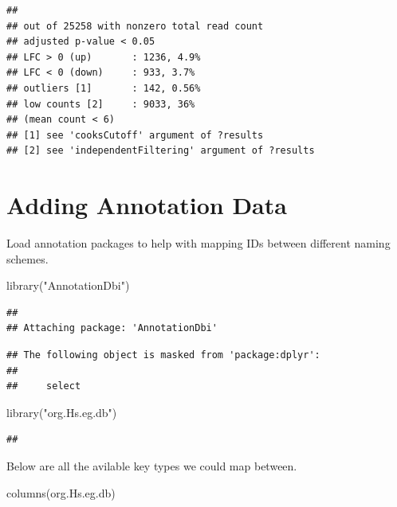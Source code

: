 \documentclass[
]{article}
\newenvironment{Shaded}{\begin{snugshade}}{\end{snugshade}}
\newcommand{\FunctionTok}[1]{\textcolor[rgb]{0.00,0.00,0.00}{#1}}
\newcommand{\NormalTok}[1]{#1}
\newcommand{\StringTok}[1]{\textcolor[rgb]{0.31,0.60,0.02}{#1}}
\begin{document}
\begin{verbatim}
## 
## out of 25258 with nonzero total read count
## adjusted p-value < 0.05
## LFC > 0 (up)       : 1236, 4.9%
## LFC < 0 (down)     : 933, 3.7%
## outliers [1]       : 142, 0.56%
## low counts [2]     : 9033, 36%
## (mean count < 6)
## [1] see 'cooksCutoff' argument of ?results
## [2] see 'independentFiltering' argument of ?results
\end{verbatim}

\hypertarget{adding-annotation-data}{%
\section{Adding Annotation Data}\label{adding-annotation-data}}

Load annotation packages to help with mapping IDs between different
naming schemes.

\begin{Shaded}
\begin{Highlighting}[]
\FunctionTok{library}\NormalTok{(}\StringTok{"AnnotationDbi"}\NormalTok{)}
\end{Highlighting}
\end{Shaded}

\begin{verbatim}
## 
## Attaching package: 'AnnotationDbi'
\end{verbatim}

\begin{verbatim}
## The following object is masked from 'package:dplyr':
## 
##     select
\end{verbatim}

\begin{Shaded}
\begin{Highlighting}[]
\FunctionTok{library}\NormalTok{(}\StringTok{"org.Hs.eg.db"}\NormalTok{)}
\end{Highlighting}
\end{Shaded}

\begin{verbatim}
## 
\end{verbatim}

Below are all the avilable key types we could map between.

\begin{Shaded}
\begin{Highlighting}[]
\FunctionTok{columns}\NormalTok{(org.Hs.eg.db)}
\end{Highlighting}
\end{Shaded}
\end{document}
